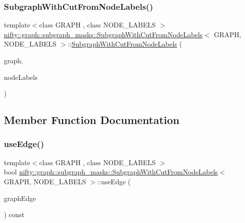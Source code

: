 \subsubsection{\texorpdfstring{Subgraph\+With\+Cut\+From\+Node\+Labels()}{SubgraphWithCutFromNodeLabels()}}
{\footnotesize\ttfamily template$<$class G\+R\+A\+PH , class N\+O\+D\+E\+\_\+\+L\+A\+B\+E\+LS $>$ \\
\hyperlink{structnifty_1_1graph_1_1subgraph__masks_1_1SubgraphWithCutFromNodeLabels}{nifty\+::graph\+::subgraph\+\_\+masks\+::\+Subgraph\+With\+Cut\+From\+Node\+Labels}$<$ G\+R\+A\+PH, N\+O\+D\+E\+\_\+\+L\+A\+B\+E\+LS $>$\+::\hyperlink{structnifty_1_1graph_1_1subgraph__masks_1_1SubgraphWithCutFromNodeLabels}{Subgraph\+With\+Cut\+From\+Node\+Labels} (\begin{DoxyParamCaption}\item[{const \hyperlink{structnifty_1_1graph_1_1subgraph__masks_1_1SubgraphWithCutFromNodeLabels_adc4d7dd452a818984b5afc989cc55a19}{Graph\+Type} \&}]{graph,  }\item[{const \hyperlink{structnifty_1_1graph_1_1subgraph__masks_1_1SubgraphWithCutFromNodeLabels_aab0ef05152a0058c18c020c8220ad30f}{Node\+Labels\+Type} \&}]{node\+Labels }\end{DoxyParamCaption})\hspace{0.3cm}{\ttfamily [inline]}}



\subsection{Member Function Documentation}
\mbox{\label{structnifty_1_1graph_1_1subgraph__masks_1_1SubgraphWithCutFromNodeLabels_a4cdeee4cf4f944010629c4fd5d05970e}} 
\subsubsection{\texorpdfstring{use\+Edge()}{useEdge()}}
{\footnotesize\ttfamily template$<$class G\+R\+A\+PH , class N\+O\+D\+E\+\_\+\+L\+A\+B\+E\+LS $>$ \\
bool \hyperlink{structnifty_1_1graph_1_1subgraph__masks_1_1SubgraphWithCutFromNodeLabels}{nifty\+::graph\+::subgraph\+\_\+masks\+::\+Subgraph\+With\+Cut\+From\+Node\+Labels}$<$ G\+R\+A\+PH, N\+O\+D\+E\+\_\+\+L\+A\+B\+E\+LS $>$\+::use\+Edge (\begin{DoxyParamCaption}\item[{const uint64\+\_\+t}]{graph\+Edge }\end{DoxyParamCaption}) const\hspace{0.3cm}{\ttfamily [inline]}}

